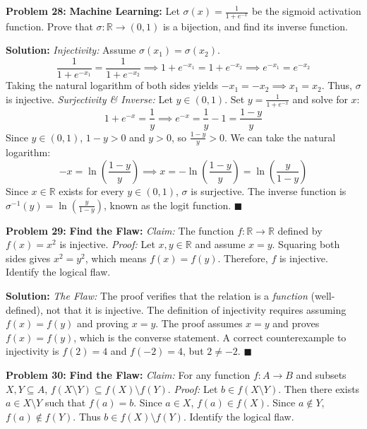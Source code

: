 \documentclass[11pt, letterpaper]{article}
\theoremstyle{definition}
\theoremstyle{remark}
\newcommand{\R}{\mathbb{R}}
\begin{document}
\vspace{1em}
\textbf{Problem 28:} \textbf{Machine Learning:} Let $\sigma(x) = \frac{1}{1 + e^{-x}}$ be the sigmoid activation function. Prove that $\sigma: \R \to (0, 1)$ is a bijection, and find its inverse function.

\textbf{Solution:}
\textit{Injectivity:} Assume $\sigma(x_1) = \sigma(x_2)$.
\[ \frac{1}{1 + e^{-x_1}} = \frac{1}{1 + e^{-x_2}} \implies 1 + e^{-x_1} = 1 + e^{-x_2} \implies e^{-x_1} = e^{-x_2} \]
Taking the natural logarithm of both sides yields $-x_1 = -x_2 \implies x_1 = x_2$. Thus, $\sigma$ is injective.
\textit{Surjectivity \& Inverse:} Let $y \in (0, 1)$. Set $y = \frac{1}{1 + e^{-x}}$ and solve for $x$:
\[ 1 + e^{-x} = \frac{1}{y} \implies e^{-x} = \frac{1}{y} - 1 = \frac{1 - y}{y} \]
Since $y \in (0, 1)$, $1 - y > 0$ and $y > 0$, so $\frac{1 - y}{y} > 0$. We can take the natural logarithm:
\[ -x = \ln\left(\frac{1 - y}{y}\right) \implies x = -\ln\left(\frac{1 - y}{y}\right) = \ln\left(\frac{y}{1 - y}\right) \]
Since $x \in \R$ exists for every $y \in (0, 1)$, $\sigma$ is surjective. The inverse function is $\sigma^{-1}(y) = \ln\left(\frac{y}{1 - y}\right)$, known as the logit function. \hfill $\blacksquare$

\vspace{1em}
\textbf{Problem 29:} \textbf{Find the Flaw:} \textit{Claim:} The function $f: \R \to \R$ defined by $f(x) = x^2$ is injective. \textit{Proof:} Let $x, y \in \R$ and assume $x = y$. Squaring both sides gives $x^2 = y^2$, which means $f(x) = f(y)$. Therefore, $f$ is injective. Identify the logical flaw.

\textbf{Solution:}
\textit{The Flaw:} The proof verifies that the relation is a \textit{function} (well-defined), not that it is injective. The definition of injectivity requires assuming $f(x) = f(y)$ and proving $x = y$. The proof assumes $x = y$ and proves $f(x) = f(y)$, which is the converse statement. A correct counterexample to injectivity is $f(2) = 4$ and $f(-2) = 4$, but $2 \neq -2$. \hfill $\blacksquare$

\vspace{1em}
\textbf{Problem 30:} \textbf{Find the Flaw:} \textit{Claim:} For any function $f: A \to B$ and subsets $X, Y \subseteq A$, $f(X \setminus Y) \subseteq f(X) \setminus f(Y)$. \textit{Proof:} Let $b \in f(X \setminus Y)$. Then there exists $a \in X \setminus Y$ such that $f(a) = b$. Since $a \in X$, $f(a) \in f(X)$. Since $a \notin Y$, $f(a) \notin f(Y)$. Thus $b \in f(X) \setminus f(Y)$. Identify the logical flaw.
\end{document}
